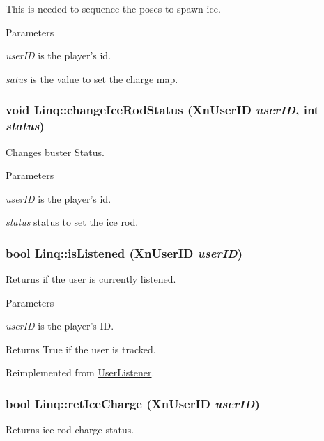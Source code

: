 This is needed to sequence the poses to spawn ice.


\begin{DoxyParams}{Parameters}
\item[{\em userID}]is the player's id. \item[{\em satus}]is the value to set the charge map. \end{DoxyParams}
\hypertarget{classLinq_a5104de663be5b3dc0a4d78ad28afb5c3}{
\subsubsection[{changeIceRodStatus}]{\setlength{\rightskip}{0pt plus 5cm}void Linq::changeIceRodStatus (XnUserID {\em userID}, \/  int {\em status})}}
\label{classLinq_a5104de663be5b3dc0a4d78ad28afb5c3}
Changes buster Status.


\begin{DoxyParams}{Parameters}
\item[{\em userID}]is the player's id. \item[{\em status}]status to set the ice rod. \end{DoxyParams}
\hypertarget{classLinq_a55070b91120aa07225d64f8bd3136c11}{
\subsubsection[{isListened}]{\setlength{\rightskip}{0pt plus 5cm}bool Linq::isListened (XnUserID {\em userID})}}
\label{classLinq_a55070b91120aa07225d64f8bd3136c11}
Returns if the user is currently listened.


\begin{DoxyParams}{Parameters}
\item[{\em userID}]is the player's ID.\end{DoxyParams}
\begin{DoxyReturn}{Returns}
True if the user is tracked. 
\end{DoxyReturn}


Reimplemented from \hyperlink{classUserListener_aea80d4da192afaf0329cf92e4489fd0a}{UserListener}.

\hypertarget{classLinq_a8bf61b41e6722b72da7e691e8e91f07b}{
\subsubsection[{retIceCharge}]{\setlength{\rightskip}{0pt plus 5cm}bool Linq::retIceCharge (XnUserID {\em userID})}}
\label{classLinq_a8bf61b41e6722b72da7e691e8e91f07b}
Returns ice rod charge status.


